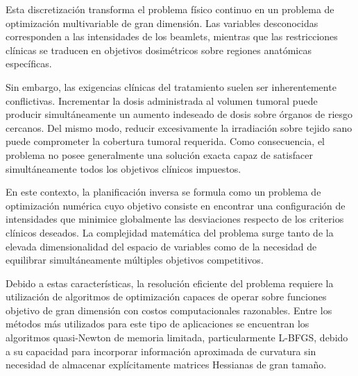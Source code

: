 Esta discretización transforma el problema físico continuo en un problema de optimización multivariable de gran dimensión. Las variables desconocidas corresponden a las intensidades de los beamlets, mientras que las restricciones clínicas se traducen en objetivos dosimétricos sobre regiones anatómicas específicas.

Sin embargo, las exigencias clínicas del tratamiento suelen ser inherentemente conflictivas. Incrementar la dosis administrada al volumen tumoral puede producir simultáneamente un aumento indeseado de dosis sobre órganos de riesgo cercanos. Del mismo modo, reducir excesivamente la irradiación sobre tejido sano puede comprometer la cobertura tumoral requerida. Como consecuencia, el problema no posee generalmente una solución exacta capaz de satisfacer simultáneamente todos los objetivos clínicos impuestos.

En este contexto, la planificación inversa se formula como un problema de optimización numérica cuyo objetivo consiste en encontrar una configuración de intensidades que minimice globalmente las desviaciones respecto de los criterios clínicos deseados. La complejidad matemática del problema surge tanto de la elevada dimensionalidad del espacio de variables como de la necesidad de equilibrar simultáneamente múltiples objetivos competitivos.

Debido a estas características, la resolución eficiente del problema requiere la utilización de algoritmos de optimización capaces de operar sobre funciones objetivo de gran dimensión con costos computacionales razonables. Entre los métodos más utilizados para este tipo de aplicaciones se encuentran los algoritmos quasi-Newton de memoria limitada, particularmente L-BFGS, debido a su capacidad para incorporar información aproximada de curvatura sin necesidad de almacenar explícitamente matrices Hessianas de gran tamaño.